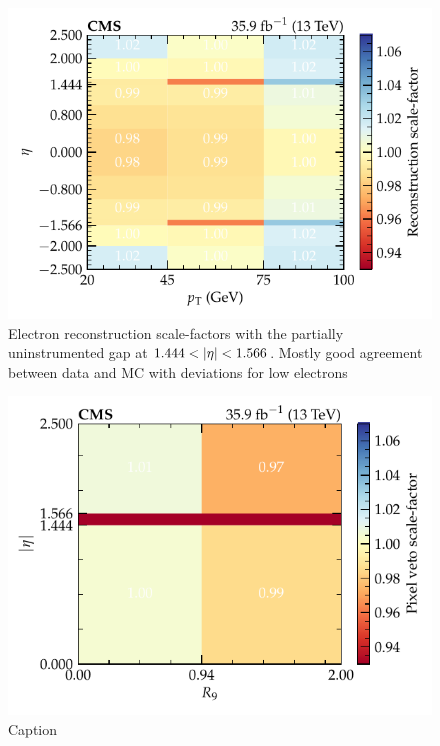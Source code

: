 \begin{figure}[htbp]
    \centering
    \includegraphics{chapters/041_corrections/images/efficiencies/objects/electrons/electron_reco_sf.pdf}
    \caption{
        Electron reconstruction scale-factors with the \ECAL partially uninstrumented gap at ${1.444<\aeta<1.566}$. Mostly good agreement between data and MC with deviations for low \pt electrons 
    }
    \label{fig:electron-reco-efficiency}
\end{figure}

\begin{figure}[htbp]
    \centering
    \includegraphics{chapters/041_corrections/images/efficiencies/objects/photons/photon_pixelveto_sf.pdf}
    \caption{Caption}
    \label{fig:photon-trackveto-efficiency}
\end{figure}


